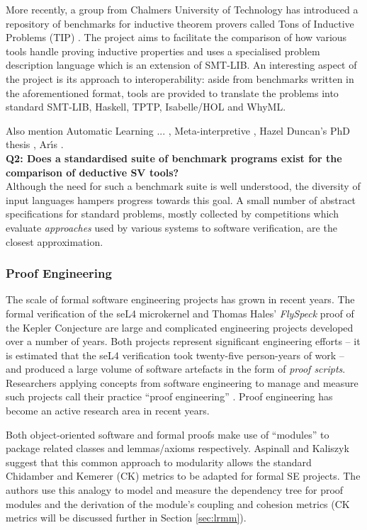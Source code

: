 More recently, a group from Chalmers University of Technology has introduced a repository of benchmarks for inductive theorem provers called Tons of Inductive Problems (TIP) \cite{Claessen2015}. 
The project aims to facilitate the comparison of how various tools handle proving inductive properties and uses a specialised problem description language which is an extension of SMT-LIB.
An interesting aspect of the project is its approach to interoperability: aside from benchmarks written in the aforementioned format, tools are provided to translate the problems into standard SMT-LIB, Haskell, TPTP, Isabelle/HOL and WhyML.
  

Also mention Automatic Learning ... \cite{AutomaticLearning}, Meta-interpretive \cite{meta-interptretive}, Hazel Duncan's PhD thesis \cite{hazelthesis}, Ar\'{\i}s \cite{aris}. \\

\textbf{Q2: Does a standardised suite of benchmark programs exist for the comparison of deductive SV tools?} \\
Although the need for such a benchmark suite is well understood, the diversity of input languages hampers progress towards this goal. 
A small number of abstract specifications for standard problems, mostly collected by competitions which evaluate \textit{approaches} used by various systems to software verification, are the closest approximation.  

\subsubsection{Proof Engineering}
\label{sub:lrsvmmpe}

The scale of formal software engineering projects has grown in recent years. The formal verification of the seL4 microkernel \cite{Klein:2014:CFV} and Thomas Hales' \textit{FlySpeck} proof of the Kepler Conjecture \cite{hales-kepler} are large and complicated engineering projects developed over a number of years. Both projects represent significant engineering efforts -- it is estimated that the seL4 verification took twenty-five person-years of work -- and produced a large volume of software artefacts in the form of \textit{proof scripts}. Researchers applying concepts from software engineering to manage and measure such projects call their practice ``proof engineering'' \cite{Klein2014}. Proof engineering has become an active research area in recent years. 

Both object-oriented software and formal proofs make use of ``modules'' to package related classes and lemmas/axioms respectively. Aspinall and Kaliszyk \cite{Aspinall2016} suggest that this common approach to modularity allows the standard Chidamber and Kemerer \cite{CandK} (CK) metrics to be adapted for formal SE projects. The authors use this analogy to model and measure the dependency tree for proof modules and the derivation of the module's coupling and cohesion metrics (CK metrics will be discussed further in Section \ref{sec:lrmm}).


